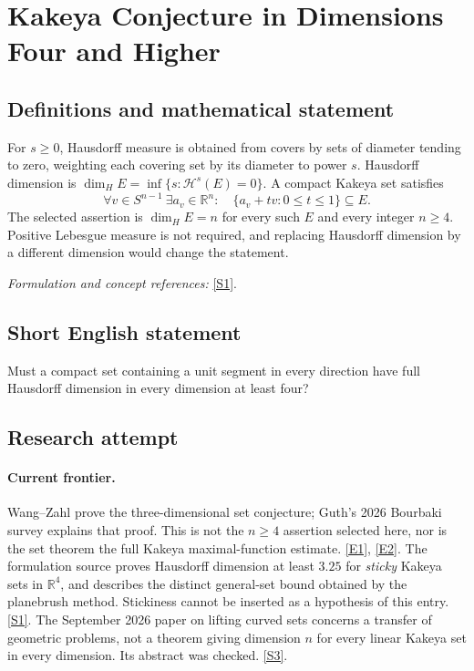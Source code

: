 \documentclass[11pt,a4paper]{article}
\newcommand{\R}{\mathbb{R}}
\newcommand{\sref}[2]{\hyperlink{source:#1:#2}{[S#2]}}
\newcommand{\eref}[2]{\hyperlink{extra:#1:#2}{[E#2]}}
\newif\ifshowcatalogue
\newcommand{\cataloguescope}[1]{\ifshowcatalogue
 \paragraph{Exact scope in the supplied catalogue.}
 \begin{quote}\small #1\end{quote}\fi}
\numberwithin{equation}{section}
\begin{document}
\setcounter{section}{0}
\clearpage
\section*{\texorpdfstring{Kakeya Conjecture in Dimensions Four and Higher}{Kakeya Conjecture in Dimensions Four and Higher}}\label{30006573}
\subsection{Definitions and mathematical statement}
For $s\ge0$, Hausdorff measure is obtained from covers by sets of diameter tending to zero, weighting each covering set by its diameter to power $s$. Hausdorff dimension is $\dim_H E=\inf\{s:\mathcal H^s(E)=0\}$. A compact Kakeya set satisfies
\[
 \forall v\in S^{n-1}\ \exists a_v\in\R^n:\quad
 \{a_v+tv:0\le t\le1\}\subseteq E.
\]
The selected assertion is $\dim_H E=n$ for every such $E$ and every integer $n\ge4$. Positive Lebesgue measure is not required, and replacing Hausdorff dimension by a different dimension would change the statement.
\par\smallskip\textit{Formulation and concept references:} \sref{30006573}{1}.
\cataloguescope{Prove or disprove that for every integer n >= 4, every compact set E in R\textasciicircum{}n that contains a unit line segment in every direction has Hausdorff dimension n.}
\subsection{Short English statement}
Must a compact set containing a unit segment in every direction have full Hausdorff dimension in every dimension at least four?
\subsection{Research attempt}

\paragraph{Current frontier.}
Wang--Zahl prove the three-dimensional set conjecture; Guth's 2026 Bourbaki
survey explains that proof. This is not the $n\ge4$ assertion selected here,
nor is the set theorem the full Kakeya maximal-function estimate.
\eref{30006573}{1}, \eref{30006573}{2}. The formulation source proves Hausdorff dimension
at least $3.25$ for \emph{sticky} Kakeya sets in $\R^4$, and describes the
distinct general-set bound obtained by the planebrush method. Stickiness
cannot be inserted as a hypothesis of this entry. \sref{30006573}{1}.
The September 2026 paper on lifting curved sets concerns a transfer of
geometric problems, not a theorem giving dimension $n$ for every linear
Kakeya set in every dimension. Its abstract was checked. \sref{30006573}{3}.
\end{document}
